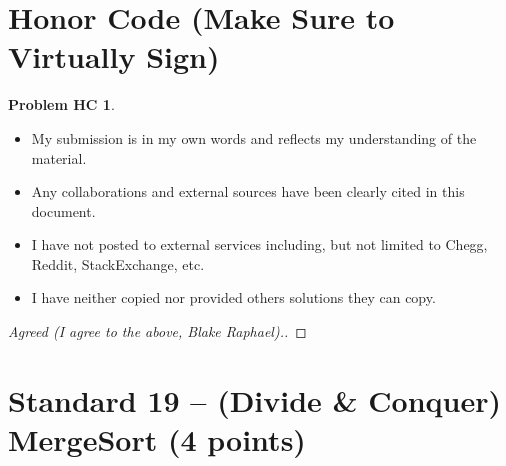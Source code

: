 \documentclass[11pt]{article}
\theoremstyle{definition}
\theoremstyle{definition}
\newtheorem*{requiredHC}{Problem HC}
\theoremstyle{definition}
\begin{document}
\newpage
\section*{Honor Code (Make Sure to Virtually Sign)} \label{HonorCode}
\hypertarget{HonorCode}{}

\begin{requiredHC}
\begin{itemize}
\item My submission is in my own words and reflects my understanding of the material.
\item Any collaborations and external sources have been clearly cited in this document.
\item I have not posted to external services including, but not limited to Chegg, Reddit, StackExchange, etc.
\item I have neither copied nor provided others solutions they can copy.
\end{itemize}

\end{requiredHC}

\begin{proof}[Agreed (I agree to the above, Blake Raphael).]
\end{proof}


\newpage
\setcounter{section}{18}
\section{Standard 19 -- (Divide \& Conquer) MergeSort (4 points)}
\end{document}
